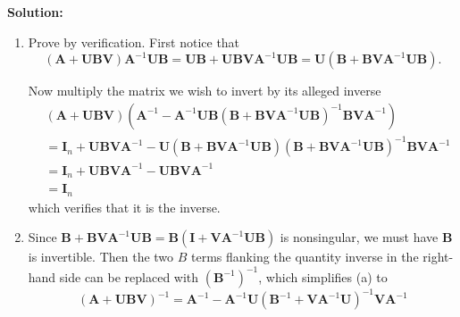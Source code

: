 \documentclass[11pt]{article}
\theoremstyle{plain} %
\newenvironment{solution}
{\color{C2}\normalfont\begin{framed}\begingroup\textbf{Solution:} }
  {\endgroup\end{framed}}
\theoremstyle{remark}
\begin{document}
\begin{solution}
  \begin{enumerate}[label = (\alph*)]
    \item Prove by verification.
          First notice that
          $$
            (\mathbf{A}+\mathbf{U B V}) \mathbf{A}^{-1} \mathbf{U B}=\mathbf{U B}+\mathbf{U B V A}^{-1} \mathbf{U B}=\mathbf{U}\left(\mathbf{B}+\mathbf{B V A}^{-1} \mathbf{U B}\right) .
          $$

          Now multiply the matrix we wish to invert by its alleged inverse
          $$
            \begin{aligned}
               & (\mathbf{A}+\mathbf{U B V})\left(\mathbf{A}^{-1}-\mathbf{A}^{-1} \mathbf{U B}\left(\mathbf{B}+\mathbf{B V A}^{-1} \mathbf{U B}\right)^{-1} \mathbf{B V A}^{-1}\right)                   \\
               & =\mathbf{I}_n+\mathbf{U B V A}^{-1}-\mathbf{U}\left(\mathbf{B}+\mathbf{B V A}^{-1} \mathbf{U B}\right)\left(\mathbf{B}+\mathbf{B V A}^{-1} \mathbf{U B}\right)^{-1} \mathbf{B V A}^{-1} \\
               & =\mathbf{I}_n+\mathbf{U B V A}^{-1}-\mathbf{U B V A}^{-1}                                                                                                                               \\
               & =\mathbf{I}_n
            \end{aligned}
          $$
          which verifies that it is the inverse.
    \item Since $\mathbf{B}+\mathbf{B V A}^{-1} \mathbf{U B}=\mathbf{B}\left(\mathbf{I}+\mathbf{V A}^{-1} \mathbf{U B}\right)$ is nonsingular, we must have $\mathbf{B}$ is invertible. Then the two $B$ terms flanking the quantity inverse in the right-hand side can be replaced with $\left(\mathbf{B}^{-1}\right)^{-1}$, which simplifies (a) to
          $$
            (\mathbf{A}+\mathbf{U B V})^{-1}=\mathbf{A}^{-1}-\mathbf{A}^{-1} \mathbf{U}\left(\mathbf{B}^{-1}+\mathbf{V A}^{-1} \mathbf{U}\right)^{-1} \mathbf{V A}^{-1}
          $$
  \end{enumerate}
\end{solution}
\end{document}
